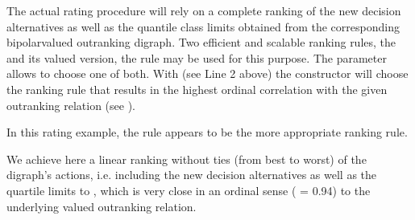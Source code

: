 \documentclass[a4paper,12pt,english]{sphinxhowto}
\begin{document}
The actual rating procedure will rely on a complete ranking of the new decision alternatives as well as the quantile class limits obtained from the corresponding bipolar\sphinxhyphen{}valued outranking digraph. Two efficient and scalable ranking rules, the  and its valued version, the  rule may be used for this purpose. The  parameter allows to choose one of both. With  (see Line 2 above) the  constructor will choose the ranking rule that results in the highest ordinal correlation with the given outranking relation (see ).

In this rating example, the  rule appears to be the more appropriate ranking rule.

\begin{sphinxVerbatim}[commandchars=\\\{\},numbers=left,firstnumber=1,stepnumber=1]
 
 
\PYG{g+go}{ [\PYGZsq{}m4\PYGZsq{}, \PYGZsq{}a1005\PYGZsq{}, \PYGZsq{}a1010\PYGZsq{}, \PYGZsq{}a1008\PYGZsq{}, \PYGZsq{}a1002\PYGZsq{}, \PYGZsq{}a1006\PYGZsq{},}
\PYG{g+go}{ \PYGZsq{}m2\PYGZsq{}, \PYGZsq{}m1\PYGZsq{}]}
 \PYGZbs{}
\end{sphinxVerbatim}

We achieve here a linear ranking without ties (from best to worst) of the digraph’s actions, i.e. including the new decision alternatives as well as the quartile limits  to , which is very close in an ordinal sense ( = 0.94) to the underlying valued outranking relation.
\end{document}
